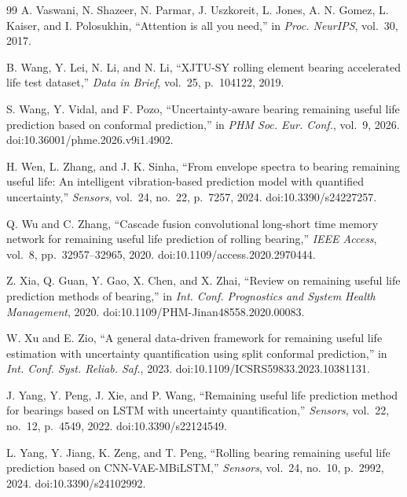 \documentclass[pdflatex,sn-basic,NameDate]{sn-jnl}
\begin{document}
\begin{thebibliography}{99}
A. Vaswani, N. Shazeer, N. Parmar, J. Uszkoreit, L. Jones, A. N. Gomez, L. Kaiser, and I. Polosukhin,
``Attention is all you need,''
in \textit{Proc. NeurIPS}, vol.~30, 2017.

B. Wang, Y. Lei, N. Li, and N. Li,
``XJTU-SY rolling element bearing accelerated life test dataset,''
\textit{Data in Brief}, vol.~25, p.~104122, 2019.

S. Wang, Y. Vidal, and F. Pozo,
``Uncertainty-aware bearing remaining useful life prediction based on conformal prediction,'' in \textit{PHM Soc. Eur. Conf.}, vol.~9, 2026. doi:10.36001/phme.2026.v9i1.4902.

H. Wen, L. Zhang, and J. K. Sinha,
``From envelope spectra to bearing remaining useful life: An intelligent vibration-based prediction model with quantified uncertainty,''
\textit{Sensors}, vol.~24, no.~22, p.~7257, 2024. doi:10.3390/s24227257.

Q. Wu and C. Zhang,
``Cascade fusion convolutional long-short time memory network for remaining useful life prediction of rolling bearing,''
\textit{IEEE Access}, vol.~8, pp.~32957--32965, 2020. doi:10.1109/access.2020.2970444.

Z. Xia, Q. Guan, Y. Gao, X. Chen, and X. Zhai,
``Review on remaining useful life prediction methods of bearing,'' in \textit{Int. Conf. Prognostics and System Health Management}, 2020. doi:10.1109/PHM-Jinan48558.2020.00083.

W. Xu and E. Zio,
``A general data-driven framework for remaining useful life estimation with uncertainty quantification using split conformal prediction,'' in \textit{Int. Conf. Syst. Reliab. Saf.}, 2023. doi:10.1109/ICSRS59833.2023.10381131.

J. Yang, Y. Peng, J. Xie, and P. Wang,
``Remaining useful life prediction method for bearings based on LSTM with uncertainty quantification,''
\textit{Sensors}, vol.~22, no.~12, p.~4549, 2022. doi:10.3390/s22124549.

L. Yang, Y. Jiang, K. Zeng, and T. Peng,
``Rolling bearing remaining useful life prediction based on CNN-VAE-MBiLSTM,''
\textit{Sensors}, vol.~24, no.~10, p.~2992, 2024. doi:10.3390/s24102992.


\end{thebibliography}
\end{document}
